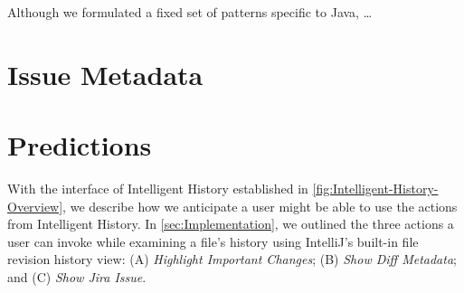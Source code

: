 Although we formulated a fixed set of patterns specific to Java, \dots {}

\section{Issue Metadata}
\label{sec:Issue-Metadata}


\section{Predictions}
\label{sec:Predictions}

With the interface of Intelligent History established in \autoref{fig:Intelligent-History-Overview}, we describe how we anticipate a user might be able to use the actions from Intelligent History. 
In \autoref{sec:Implementation}, we outlined the three actions a user can invoke while examining a file's history using IntelliJ's built-in file revision history view: (A) \textit{Highlight Important Changes}; (B) \textit{Show Diff Metadata}; and (C) \textit{Show Jira Issue}.

\endinput

Any text after an \endinput is ignored.
You could put scraps here or things in progress.
